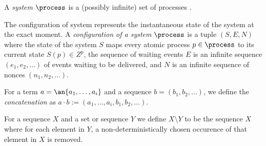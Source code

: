 \begin{definition}[Systems]
A \emph{system} $\process$ is a  (possibly infinite) set of processes \aps.
\end{definition}

\begin{definition}[Configurations]
 The configuration of system represents the instantaneous state of the system at the exact moment.
  A \emph{configuration of a system $\process$} is a tuple $(S, E, N)$
  where the state of the system $S$ maps every atomic process  $p\in \process$ to its current state $S(p)\in Z^p$, the sequence of  waiting events $E$ is an infinite sequence $(e_1, e_2, \dots)$ of events waiting to be delivered, and $N$ is an infinite sequence of nonces  $(n_1, n_2, \dots)$.
\end{definition}

\begin{definition}
  For a term $a = \an{a_1, \dots, a_i}$ and a sequence $b = (b_1, b_2,
  \dots)$, we define the \emph{concatenation} as $a \cdot b := (a_1,
  \dots, a_i, b_1, b_2, \dots)$.
  
\end{definition}

\begin{definition}
  For a sequence $X$ and a set or sequence $Y$ we define $X \setminus
  Y$ to be the sequence $X$ where for each element in $Y$, a
  non-deterministically chosen occurence of that element in $X$ is
  removed.
\end{definition}

